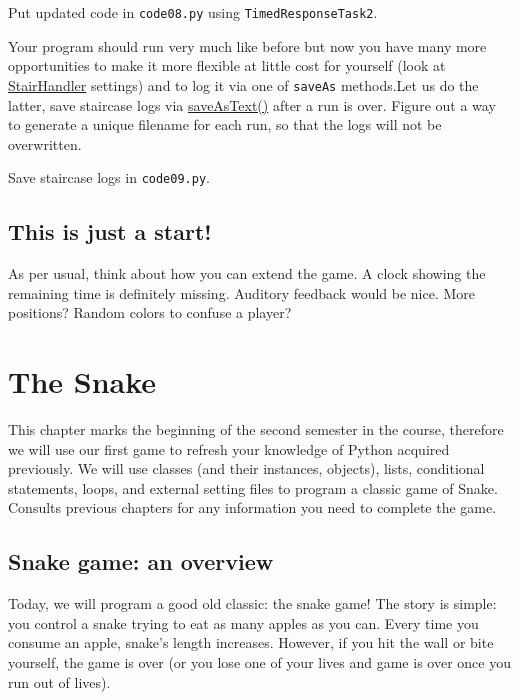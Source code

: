 \documentclass[
]{book}
\begin{document}
Put updated code in \texttt{code08.py} using \texttt{TimedResponseTask2}.

Your program should run very much like before but now you have many more opportunities to make it more flexible at little cost for yourself (look at \href{https://psychopy.org/api/data.html\#stairhandler}{StairHandler} settings) and to log it via one of \texttt{saveAs} methods.Let us do the latter, save staircase logs via \href{https://psychopy.org/api/data.html\#psychopy.data.StairHandler.saveAsText}{saveAsText()} after a run is over. Figure out a way to generate a unique filename for each run, so that the logs will not be overwritten.

Save staircase logs in \texttt{code09.py}.

\hypertarget{this-is-just-a-start}{%
\section{This is just a start!}\label{this-is-just-a-start}}

As per usual, think about how you can extend the game. A clock showing the remaining time is definitely missing. Auditory feedback would be nice. More positions? Random colors to confuse a player?

\hypertarget{the-snake}{%
\chapter{The Snake}\label{the-snake}}

This chapter marks the beginning of the second semester in the course, therefore we will use our first game to refresh your knowledge of Python acquired previously. We will use classes (and their instances, objects), lists, conditional statements, loops, and external setting files to program a classic game of Snake. Consults previous chapters for any information you need to complete the game.

\hypertarget{snake-game-an-overview}{%
\section{Snake game: an overview}\label{snake-game-an-overview}}

Today, we will program a good old classic: the snake game! The story is simple: you control a snake trying to eat as many apples as you can. Every time you consume an apple, snake's length increases. However, if you hit the wall or bite yourself, the game is over (or you lose one of your lives and game is over once you run out of lives).
\end{document}
